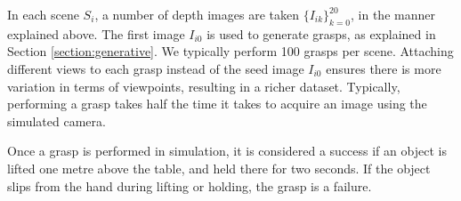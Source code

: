 
In each scene $S_i$, a number of depth images are taken $\{I_{ik}\}_{k=0}^{20}$, in the manner explained above. The first image $I_{i0}$ is used to generate grasps, as explained in Section \ref{section:generative}. We typically perform 100 grasps per scene. Attaching different views to each grasp instead of the seed image $I_{i0}$ ensures there is more variation in terms of viewpoints, resulting in a richer dataset. Typically, performing a grasp takes half the time it takes to acquire an image using the simulated camera.

Once a grasp is performed in simulation, it is considered a success if an object is lifted one metre above the table, and held there for two seconds. If the object slips from the hand during lifting or holding, the grasp is a failure. 

